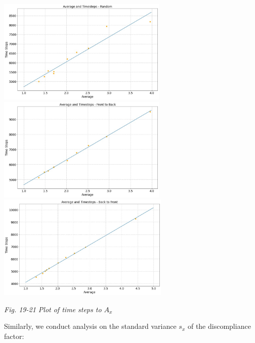 \documentclass{article}
\theoremstyle{definition}
\theoremstyle{remark}
\numberwithin{equation}{section}
\begin{document}
	\begin{center}
		\includegraphics[height = 5cm]{avetimesteps random fitted.jpg}
		\includegraphics[height = 5cm]{avetimesteps ftb fitted.jpg}
		\includegraphics[height = 5cm]{variance and timesteps btf.jpg}

		\small\textit{Fig. 19-21 Plot of time steps to \(A_x\)}
	\end{center}


	Similarly, we conduct analysis on the standard variance \(s_x\) of the discompliance factor:
\end{document}
